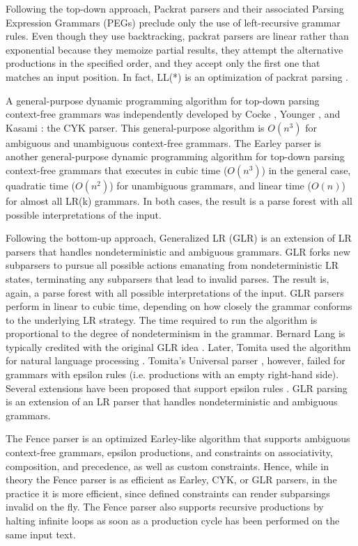 \documentclass[preprint]{elsarticle}
\begin{document}
Following the top-down approach, Packrat parsers \cite{Ford2002packrat} and their associated Parsing Expression Grammars (PEGs) \cite{Ford2004peg} preclude only the use of left-recursive grammar rules.
Even though they use backtracking, packrat parsers are linear rather than exponential because they memoize partial results, they attempt the alternative productions in the specified order, and they accept only the first one that matches an input position.
In fact, LL(*) is an optimization of packrat parsing \cite{Parr2011}.

A general-purpose dynamic programming algorithm for top-down parsing context-free grammars was independently developed by Cocke \cite{Cocke1970}, Younger \cite{Younger1967}, and Kasami \cite{Kasami1965}: the CYK parser.
This general-purpose algorithm is $O(n^3)$ for ambiguous and unambiguous context-free grammars.
The Earley parser \cite{Earley1970} is another general-purpose dynamic programming algorithm for top-down parsing context-free grammars that executes in cubic time ($O(n^3)$) in the general case, quadratic time ($O(n^2)$) for unambiguous grammars, and linear time ($O(n)$) for almost all LR(k) grammars.
In both cases, the result is a parse forest with all possible interpretations of the input.

Following the bottom-up approach, Generalized LR (GLR) is an extension of LR parsers that handles nondeterministic and ambiguous grammars.
GLR forks new subparsers to pursue all possible actions emanating from nondeterministic LR states, terminating any subparsers that lead to invalid parses.
The result is, again, a parse forest with all possible interpretations of the input.
GLR parsers perform in linear to cubic time, depending on how closely the grammar conforms to the underlying LR strategy.
The time required to run the algorithm is proportional to the degree of nondeterminism in the grammar.
Bernard Lang is typically credited with the original GLR idea \cite{Lang1974}.
Later, Tomita used the algorithm for natural language processing \cite{Tomita1985}.
Tomita's Universal parser \cite{Tomita1987}, however, failed for grammars with epsilon rules (i.e. productions with an empty right-hand side).
Several extensions have been proposed that support epsilon rules \cite{Farshi1991,Rekers1992,Ishii1994,McPeak2004}.
GLR parsing is an extension of an LR parser that handles nondeterministic and ambiguous grammars.

The Fence parser \cite{Quesada2012f} is an optimized Earley-like algorithm that supports ambiguous context-free grammars, epsilon productions, and constraints on associativity, composition, and precedence, as well as custom constraints.
Hence, while in theory the Fence parser is as efficient as Earley, CYK, or GLR parsers, in the practice it is more efficient, since defined constraints can render subparsings invalid on the fly.
The Fence parser also supports recursive productions by halting infinite loops as soon as a production cycle has been performed on the same input text.
\end{document}
